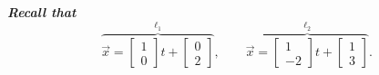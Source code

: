 \documentclass{article}
\begin{document}
	\Large\bf \color{NavyBlue} \textit{Recall that}
	\[
		\overbrace{\vec{x} =
		\begin{bmatrix}
			1\\
			0
		\end{bmatrix}t +
		\begin{bmatrix}
			0\\
			2
		\end{bmatrix}}^{\ell_1}, \qquad \overbrace{\vec{x} =
		\begin{bmatrix}
			1 \\
			-2
		\end{bmatrix}t +
		\begin{bmatrix}
			1\\
			3
		\end{bmatrix}}^{\ell_2}.
	\]


	\medskip
\end{document}
